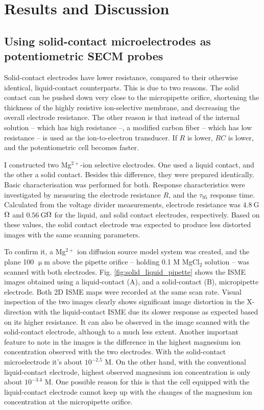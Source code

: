 \section{Results and Discussion}
\subsection{Using solid-contact microelectrodes as potentiometric SECM probes}
Solid-contact electrodes have lower resistance, compared to their otherwise identical, liquid-contact counterparts.
This is due to two reasons.
The solid contact can be pushed down very close to the micropipette orifice, shortening the thickness of the highly resistive ion-selective membrane, and decreasing the overall electrode resistance.
The other reason is that instead of the internal solution -- which has high resistance --, a modified carbon fiber -- which has low resistance -- is used as the ion-to-electron transducer.
If $R$ is lower, $RC$ is lower, and the potentiometric cell becomes faster.

I constructed two Mg$^{2+}$-ion selective electrodes.
One used a liquid contact, and the other a solid contact.
Besides this difference, they were prepared identically.
Basic characterisation was performed for both.
Response characteristics were investigated by measuring the electrode resistance $R$, and the $\tau_{95}$ response time.
Calculated from the voltage divider measurements, electrode resistance was $4.8~$G$\ohm$ and $0.56~$G$\ohm$ for the liquid, and solid contact electrodes, respectively.
Based on these values, the solid contact electrode was expected to produce less distorted images with the same scanning parameters.

To confirm it, a Mg$^{2+}$ ion diffusion source model system was created, and the plane 100 $\upmu$m above the pipette orifice -- holding 0.1 M MgCl$_2$ solution -- was scanned with both electrodes.
Fig. \ref{fig:solid_liquid_pipette} shows the ISME images obtained using a liquid-contact (A), and a solid-contact (B), micropipette electrode.
Both 2D ISME maps were recorded at the same scan rate.
Visual inspection of the two images clearly shows significant image distortion in the X-direction with the liquid-contact ISME due its slower response as expected based on its higher resistance.
It can also be observed in the image scanned with the solid-contact electrode, although to a much less extent.
Another important feature to note in the images is the difference in the highest magnesium ion concentration observed with the two electrodes.
With the solid-contact microelectrode it's about $10^{-2.5}$ M.
On the other hand, with the conventional liquid-contact electrode, highest observed magnesium ion concentration is only about $10^{-3.4}$ M.
One possible reason for this is that the cell equipped with the liquid-contact electrode cannot keep up with the changes of the magnesium ion concentration at the micropipette orifice.

